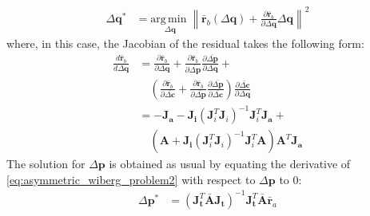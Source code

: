 \begin{equation}
    \begin{aligned}
        \Delta\mathbf{q}^* & = \underset{\Delta\mathbf{q}}{\mathrm{arg\,min\;}}  \left\| \bar{\mathbf{r}}_b(\Delta\mathbf{q}) + \frac{\partial \bar{\mathbf{r}}_b}{\partial\Delta\mathbf{q}} \Delta\mathbf{q} \right\|^2
    \label{eq:bidirectional_wiberg_problem2}
    \end{aligned}
\end{equation}
where, in this case, the Jacobian of the residual takes the following form:
\begin{equation}
    \begin{aligned}
        \frac{d \bar{\mathbf{r}}_b}{d \Delta \mathbf{q}} & = \frac{\partial \bar{\mathbf{r}}_b}{\partial \Delta \mathbf{q}} + \frac{\partial \bar{\mathbf{r}}_b}{\partial \bar{\Delta \mathbf{p}}} \frac{\partial \bar{\Delta \mathbf{p}}}{\partial \Delta \mathbf{q}} + 
        \\
        & \quad \left( \frac{\partial\bar{\mathbf{r}}_b}{\partial \bar{\Delta \mathbf{c}}} + \frac{\partial \bar{\mathbf{r}}_b}{\partial \bar{\Delta \mathbf{p}}} \frac{\partial \bar{\Delta \mathbf{p}}}{\partial \bar{\Delta \mathbf{c}}} \right) \frac{\partial \bar{\Delta \mathbf{c}}}{\partial \Delta \mathbf{q}}
        \\
        & = - \mathbf{J}_{\mathbf{a}} - \mathbf{J}_{\mathbf{i}} \left( \mathbf{J}_i^T \mathbf{J}_i \right)^{-1} \mathbf{J}_i^T \mathbf{J}_{\mathbf{a}} +
        \\
        & \quad \left(\mathbf{A} + \mathbf{J}_{\mathbf{i}} \left( \mathbf{J}_i^T \mathbf{J}_i \right)^{-1} \mathbf{J}_i^T \mathbf{A} \right) \mathbf{A}^T \mathbf{J}_{\mathbf{a}}
    \label{eq:bidirectional_wiberg_jacobian}
    \end{aligned}
\end{equation}
 The solution for $\Delta\mathbf{p}$ is obtained as usual by equating the derivative of \ref{eq:asymmetric_wiberg_problem2} with respect to $\Delta\mathbf{p}$ to 0:
 \begin{equation}
    \begin{aligned}
    	\Delta \mathbf{p}^* & = \left( \mathbf{J}_{\mathbf{t}}^T \bar{\mathbf{A}} \mathbf{J}_{\mathbf{t}} \right)^{-1} \mathbf{J}_{\mathbf{t}}^T \bar{\mathbf{A}} \bar{\mathbf{r}}_a
    \label{eq:asymmetric_wiberg_solution}
    \end{aligned}
\end{equation}





